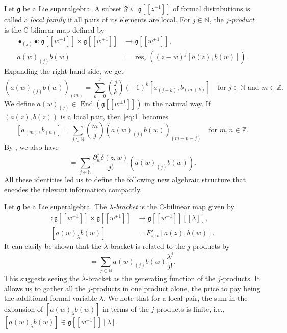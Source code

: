 \documentclass[a4paper, 12pt, reqno]{amsart}
\theoremstyle{remark}
\DeclareMathOperator{\End}{End}
\DeclareMathOperator{\res}{res}
\begin{document}
Let $\mathfrak{g}$ be a Lie superalgebra.
A subset $\mathfrak{F} \subseteq \mathfrak{g}[[z^{\pm1}]]$ of formal distributions is called a \emph{local family} if all pairs of its elements are local.
For $j \in \mathbb{N}$, the \emph{$j$-product} is the $\mathbb{C}$-bilinear map defined by
\begin{align}
  \nonumber
  \bullet_{(j)}\bullet: \mathfrak{g}[[w^{\pm1}]] \times \mathfrak{g}[[w^{\pm1}]] &\to \mathfrak{g}[[w^{\pm1}]], \\
  \label{eq:2}
  a(w)_{(j)}b(w) &= \res_z((z - w)^j[a(z), b(w)]).
\end{align}
Expanding the right-hand side, we get
\begin{equation}
  \label{eq:3}
  (a(w)_{(j)}b(w))_{(m)} = \sum_{k = 0}^j\binom{j}{k}(-1)^k[a_{(j - k)}, b_{(m + k)}] \quad \text{for $j \in \mathbb{N}$ and $m \in \mathbb{Z}$}.
\end{equation}
We define $a(w)_{(j)} \in \End(\mathfrak{g}[[w^{\pm1}]])$ in the natural way.
If $(a(z), b(z))$ is a local pair, then \eqref{eq:1} becomes
\begin{equation}
  \label{eq:4}
  [a_{(m)}, b_{(n)}] = \sum_{j \in \mathbb{N}}\binom{m}{j}(a(w)_{(j)}b(w))_{(m + n - j)} \quad \text{for $m, n \in \mathbb{Z}$}.
\end{equation}
By , we also have
\begin{equation*}
  [a(z), b(w)] = \sum_{j \in \mathbb{N}}\frac{\partial_w^j\delta(z, w)}{j!}(a(w)_{(j)}b(w)).
\end{equation*}
All these identities led us to define the following new algebraic structure that encodes the relevant information compactly.

Let $\mathfrak{g}$ be a Lie superalgebra.
The \emph{$\lambda$-bracket} is the $\mathbb{C}$-bilinear map given by
\begin{align*}
  [\bullet_{\lambda}\bullet]: \mathfrak{g}[[w^{\pm1}]] \times \mathfrak{g}[[w^{\pm1}]] &\to \mathfrak{g}[[w^{\pm1}]][[\lambda]], \\
  [a(w)_{\lambda}b(w)] &= F^{\lambda}_{z, w}[a(z), b(w)].
\end{align*}
It can easily be shown that the $\lambda$-bracket is related to the $j$-products by
\begin{equation*}
  [a(w)_{\lambda}b(w)] = \sum_{j \in \mathbb{N}}a(w)_{(j)}b(w)\frac{\lambda^j}{j!}.
\end{equation*}
This suggests seeing the $\lambda$-bracket as the generating function of the $j$-products.
It allows us to gather all the $j$-products in one product alone, the price to pay being the additional formal variable $\lambda$.
We note that for a local pair, the sum in the expansion of $[a(w)_{\lambda}b(w)]$ in terms of the $j$-products is finite, i.e., $[a(w)_{\lambda}b(w)] \in \mathfrak{g}[[w^{\pm1}]][\lambda]$.
\end{document}
